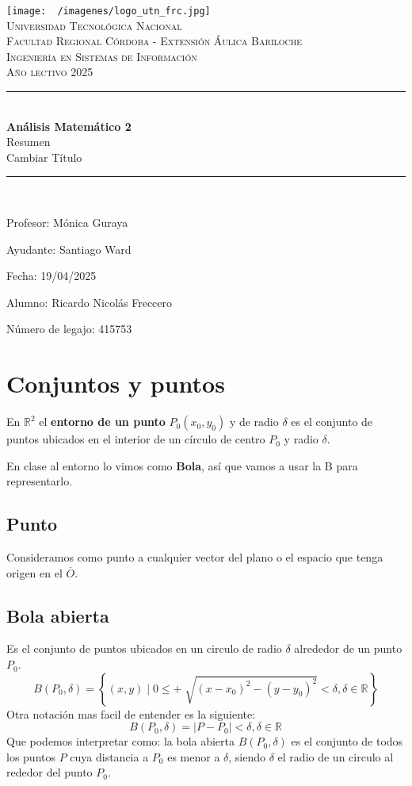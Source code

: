 \documentclass[12pt]{article}
\begin{document}
\begin{titlepage}
	\centering
	\texttt{[image: ~/imagenes/logo\_utn\_frc.jpg]}\\

	\textsc{
		\LARGE Universidad Tecnológica Nacional\\
		\Large Facultad Regional Córdoba - Extensión Áulica Bariloche\\
		\large Ingeniería en Sistemas de Información\\
		Año lectivo 2025\\[0.5cm]
	}

	\rule{\linewidth}{1.0mm}\\[0.4cm]
	\Huge
	\textbf{Análisis Matemático 2}\\
	Resumen\\[0.2cm]
	\LARGE
	Cambiar Título
	\rule{\linewidth}{1.0mm}\\
	\large
	\begin{flushleft}
		Profesor: Mónica Guraya

		Ayudante: Santiago Ward

		Fecha: 19/04/2025
	\end{flushleft}

	\vfill
	\begin{flushright}
		Alumno: Ricardo Nicolás Freccero

		Número de legajo: 415753
	\end{flushright}
\end{titlepage}

\restoregeometry
\tableofcontents
\newpage


\section{Conjuntos y puntos}
En $ \mathbb{R}^{2} $ el \textbf{entorno de un punto} $ P_{0}(x_{0}, y_{0}) $ y de radio $ \delta $ es el conjunto de puntos ubicados en el interior de un círculo de centro $ P_{0} $ y radio $ \delta $.

En clase al entorno lo vimos como \textbf{Bola}, así que vamos a usar la B para representarlo.

\subsection{Punto}
Consideramos como punto a cualquier vector del plano o el espacio que tenga origen en el $ \overline{O} $.

\subsection{Bola abierta}
Es el conjunto de puntos ubicados en un circulo de radio $ \delta $ alrededor de un punto $ P_{0} $.
\[
	B(P_{0}, \delta) = \left\{(x,y) \mid 0\leq+\sqrt[]{(x-x_{0})^{2}-(y-y_{0})^{2}}<\delta, \delta \in \mathbb{R}^{}\right\}
\]
Otra notación mas facil de entender es la siguiente:
\[
	B(P_{0}, \delta) = \left|P - P_{0}\right| < \delta, \delta \in \mathbb{R}^{}
\]
Que podemos interpretar como: la bola abierta $ B(P_{0}, \delta) $ es el conjunto de todos los puntos $ P $ cuya distancia a $ P_{0} $ es menor a $ \delta $, siendo $ \delta $ el radio de un circulo al rededor del punto $ P_{0} $.
\end{document}
